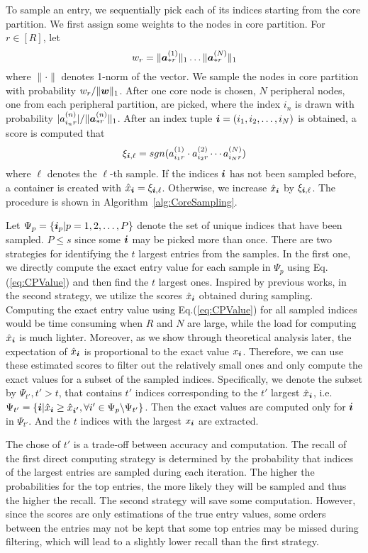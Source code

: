 \documentclass[10pt,journal,compsoc]{IEEEtran}
\newcommand{\Sca}[3]{{#1}^{(#2)}_{i_#2#3}}%
\newcommand{\anr}[2]{\Sca{a}{#1}{#2}}
\newcommand{\score}[1]{\xi_{\V{i},#1}}
\newcommand{\V}[1]{{\boldsymbol{{\MakeLowercase{#1}}}}}
\newcommand{\ColVec}[3]{\V{#1}^{(#2)}_{#3}}
\newcommand{\NormColA}[2]{\norm{\ColVec{a}{#1}{*#2}}{1}}
\newcommand{\ColVecA}[1]{\V{a}^{(#1)}_{*r}}
\newcommand{\coord}{(i_1,i_2,\ldots,i_N)}
\newcommand{\WeightR}{\NormColA{1}{r}\ldots\NormColA{N}{r}}
\newcommand{\predx}{\hat{x}_{\V{i}}}
\newcommand{\norm}[2]{\|#1\|_{#2}}
\newcommand{\Eqn}[1]{Eq.(\ref{eq:#1})}
\newcommand{\Alg}[1]{Algorithm~\ref{alg:#1}}
\begin{document}
To sample an entry, we sequentially pick each of its indices starting from the core partition. We first assign some weights to the nodes in core partition. For $r\in[R]$, let
\begin{equation}
w_r = \WeightR
\end{equation}
where $\|\cdot\|$ denotes 1-norm of the vector.
We sample the nodes in core partition with probability $w_r/\norm{\V{W}}{1}$.
After one core node is chosen,
$N$ peripheral nodes, one from each peripheral partition, are picked,
where the index $i_n$ is drawn with probability $|\anr{n}{r}|/\norm{\ColVecA{n}}{1}$.
After an index tuple $\V{i}=\coord$ is obtained,
a score is computed that
\begin{align}
\score{\ell}  = sgn(\anr{1}{r}\cdot\anr{2}{r}\cdots\anr{N}{r})
\end{align}
where $\ell$ denotes the $\ell$-th sample.
If the indices $\V{i}$ has not been sampled before,
a container is created with $\predx = \score{\ell}$.
Otherwise, we increase $\predx$ by $\score{\ell}$.
The procedure is shown in \Alg{CoreSampling}.

Let $\Psi_p = \{\V{i}_p|p = 1,2,\ldots,P\}$
denote the set of unique indices that have been sampled.
$P\leq s$ since some $\V{i}$ may be picked more than once.
There are two strategies for identifying the $t$ largest entries from the samples.
In the first one,
we directly compute the exact entry value for each sample in $\Psi_{p}$ using \Eqn{CPValue}
and then find the $t$ largest ones.
Inspired by previous works, in the second strategy,
we utilize the scores $\predx$ obtained during sampling.
Computing the exact entry value using \Eqn{CPValue} for all sampled indices
would be time consuming when $R$ and $N$ are large,
while the load for computing $\predx$ is much lighter.
Moreover, as we show through theoretical analysis later,
the expectation of $\predx$ is proportional to the exact value $x_{\V{i}}$.
Therefore, we can use these estimated scores to filter out the relatively small ones
and only compute the exact values for a subset of the sampled indices.
Specifically, we denote the subset by $\Psi_{t'},t'>t$,
that contains $t'$ indices corresponding to the $t'$ largest $\predx$, i.e.
$
\Psi_{t'} = \{ \V{i} | \predx \geq \hat{x}_{\V{i'}},
\forall i'\in \Psi_{p} \backslash \Psi_{t'}
\}
$.
Then the exact values  are computed only for $\V{i}$ in $\Psi_{t'}$.
And the $t$ indices with the largest $x_{\V{i}}$ are extracted.

The chose of $t'$ is a trade-off between accuracy and computation.
The recall of the first direct computing strategy is determined by the probability
that indices of the largest entries are sampled during each iteration.
The higher the probabilities for the top entries, the more likely they will be sampled
and thus the higher the recall.
The second strategy will save some computation.
However, since the scores are only estimations of the true entry values,
some orders between the entries may not be kept
that some top entries may be missed during filtering,
which will lead to a slightly lower recall than the first strategy.
\end{document}
